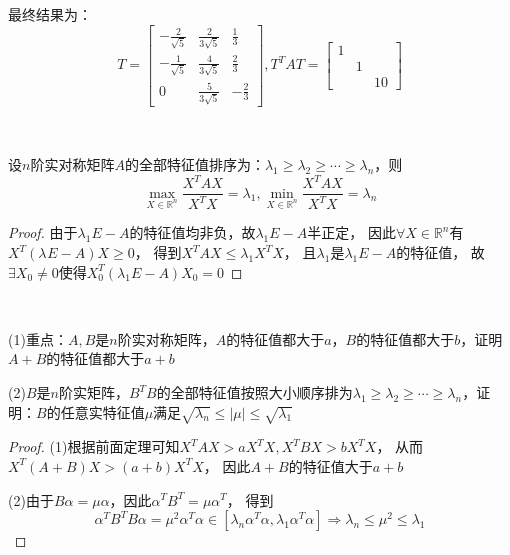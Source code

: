 \begin{solution}
  最终结果为：
  \begin{equation*}
    T = \left[
      \begin{array}{ccc}
        -\frac{2}{\sqrt{5}}&\frac{2}{3 \sqrt{5}}&\frac{1}{3} \\
                           - \frac{1}{\sqrt{5}}&\frac{4}{3 \sqrt{5}}&\frac{2}{3} \\
                           0&\frac{5}{3 \sqrt{5}}&- \frac{2}{3}
      \end{array}
    \right], T^T AT = \left[
      \begin{array}{ccc}
        1&& \\
         &1& \\
         &&10
      \end{array}
    \right]
  \end{equation*}
\end{solution}

~

\begin{theorem}[二次型与特征值]
  设$n$阶实对称矩阵$A$的全部特征值排序为：$\lambda_1 \geq \lambda_2 \geq \cdots \geq \lambda_n$，则
  \begin{equation*}
    \max \limits_{X \in \mathbb{R}^n} \frac{X^TAX}{X^TX} = \lambda_1, \min \limits_{X \in \mathbb{R}^n} \frac{X^TAX}{X^TX} = \lambda_n
  \end{equation*}
\end{theorem}

\begin{proof}
  由于$\lambda_1E - A$的特征值均非负，故$\lambda_1E - A$半正定，
  因此$\forall X \in \mathbb{R}^n$有$X^T(\lambda_{} E - A)X \geq 0$，
  得到$X^TAX \leq \lambda_1X^TX$，
  且$\lambda_1$是$\lambda_1 E - A$的特征值，
  故$\exists X_0 \neq 0$使得$X_0^T(\lambda_1 E - A)X_0 = 0$
\end{proof}

~

\begin{exercise}[二次型的特征值研究]
  (1)重点：$A,B$是$n$阶实对称矩阵，$A$的特征值都大于$a$，$B$的特征值都大于$b$，证明$A+B$的特征值都大于$a+b$

  (2)$B$是$n$阶实矩阵，$B^TB$的全部特征值按照大小顺序排为$\lambda_1 \geq \lambda_2 \geq \cdots \geq \lambda_n$，证明：$B$的任意实特征值$\mu$满足$\sqrt{\lambda_n} \leq |\mu| \leq \sqrt{\lambda_1}$
\end{exercise}

\begin{proof}
  (1)根据前面定理可知$X^TAX > aX^TX, X^TBX > bX^TX$，
  从而$X^T(A+B)X > (a+b)X^TX$，
  因此$A+B$的特征值大于$a+b$

  (2)由于$B \alpha = \mu \alpha$，因此$\alpha^T B^T = \mu \alpha^T$，
  得到
  \begin{equation*}
    \alpha^TB^T B \alpha = \mu^2 \alpha^T \alpha \in [\lambda_n\alpha^T \alpha, \lambda_1\alpha^T \alpha] \Rightarrow \lambda_n \leq \mu^2 \leq \lambda_1
  \end{equation*}
\end{proof}


